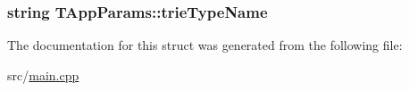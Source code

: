 \subsubsection[{trie\+Type\+Name}]{\setlength{\rightskip}{0pt plus 5cm}string T\+App\+Params\+::trie\+Type\+Name}\label{struct_t_app_params_a013e2bf1bb7b68a7807caf4c40caaf86}


The documentation for this struct was generated from the following file\+:\begin{DoxyCompactItemize}
\item 
src/\hyperlink{main_8cpp}{main.\+cpp}\end{DoxyCompactItemize}
